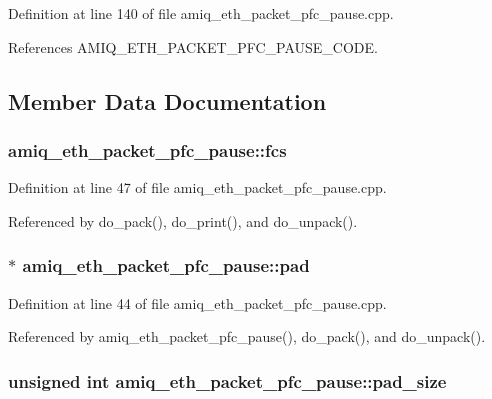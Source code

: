 Definition at line 140 of file amiq\_\-eth\_\-packet\_\-pfc\_\-pause.cpp.

References AMIQ\_\-ETH\_\-PACKET\_\-PFC\_\-PAUSE\_\-CODE.

\subsection{Member Data Documentation}
\hypertarget{classamiq__eth__packet__pfc__pause_a5cc679d0d63288a1494f7e5bc6316012}{
\subsubsection[{fcs}]{ {\bf amiq\_\-eth\_\-packet\_\-pfc\_\-pause::fcs}}}
\label{classamiq__eth__packet__pfc__pause_a5cc679d0d63288a1494f7e5bc6316012}


Definition at line 47 of file amiq\_\-eth\_\-packet\_\-pfc\_\-pause.cpp.

Referenced by do\_\-pack(), do\_\-print(), and do\_\-unpack().\hypertarget{classamiq__eth__packet__pfc__pause_a70fc4ed398159e0af2d8fc40f0476ed3}{
\subsubsection[{pad}]{$\ast$ {\bf amiq\_\-eth\_\-packet\_\-pfc\_\-pause::pad}}}
\label{classamiq__eth__packet__pfc__pause_a70fc4ed398159e0af2d8fc40f0476ed3}


Definition at line 44 of file amiq\_\-eth\_\-packet\_\-pfc\_\-pause.cpp.

Referenced by amiq\_\-eth\_\-packet\_\-pfc\_\-pause(), do\_\-pack(), and do\_\-unpack().\hypertarget{classamiq__eth__packet__pfc__pause_a74ea8b2618525e64c9cad21dc4927f6b}{
\subsubsection[{pad\_\-size}]{\setlength{\rightskip}{0pt plus 5cm}unsigned int {\bf amiq\_\-eth\_\-packet\_\-pfc\_\-pause::pad\_\-size}}}
\label{classamiq__eth__packet__pfc__pause_a74ea8b2618525e64c9cad21dc4927f6b}


